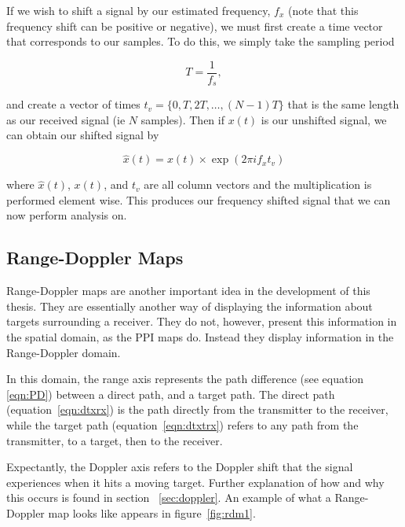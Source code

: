 \documentclass[12pt,openany,a4paper]{book}
\begin{document}
If we wish to shift a signal by our estimated frequency, $f_x$ (note that this frequency shift can be positive or negative), we must first create a time vector that corresponds to our samples. To do this, we simply take the sampling period

\begin{equation}
T = \frac{1}{f_s},
\end{equation}

\bigskip

and create a vector of times $t_v = \{0, T, 2T, \ldots , (N-1)T\}$ that is the same length as our received signal (ie $N$ samples). Then if $x(t)$ is our unshifted signal, we can obtain our shifted signal by 

\begin{equation}
\hat{x}(t) = x(t) \times \exp (2\pi i f_x t_v )
\end{equation}

\bigskip

where $\hat{x}(t)$, $x(t)$, and $t_v$ are all column vectors and the multiplication is performed element wise. This produces our frequency shifted signal that we can now perform analysis on.


\subsection{Range-Doppler Maps}
\label{sec:rdMap}
Range-Doppler maps are another important idea in the development of this thesis. They are essentially another way of displaying the information about targets surrounding a receiver. They do not, however, present this information in the spatial domain, as the PPI maps do. Instead they display information in the Range-Doppler domain. 

\bigskip

In this domain, the range axis represents the path difference (see equation \ref{eqn:PD}) between a direct path, and a target path. The direct path (equation~\ref{eqn:dtxrx}) is the path directly from the transmitter to the receiver, while the target path (equation~\ref{eqn:dtxtrx}) refers to any path from the transmitter, to a target, then to the receiver.

\bigskip

Expectantly, the Doppler axis refers to the Doppler shift that the signal experiences when it hits a moving target. Further explanation of how and why this occurs is found in section ~\ref{sec:doppler}. An example of what a Range-Doppler map looks like appears in figure~\ref{fig:rdm1}.
\end{document}
